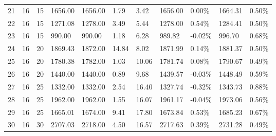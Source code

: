 \documentclass[../main]{subfiles}
\begin{document}
\begin{longtable}{l|ll|lll|lllll}
   21                  & 16                              & 15                     & 1656.00             & 1656.00  & 1.79          & 3.42                       & \cellcolor{green!25}1656.00 & 0.00\%  & 1664.31 & 0.50\% \\
   22                  & 16                              & 15                     & 1271.08             & 1278.00  & 3.49          & 5.44                       & \cellcolor{green!25}1278.00 & 0.54\%  & 1284.41 & 0.50\% \\
   23                  & 16                              & 15                     & 990.00              & 990.00   & 1.18          & 6.28                       & 989.82                      & -0.02\% & 996.70  & 0.68\% \\
   24                  & 16                              & 20                     & 1869.43             & 1872.00  & 14.84         & \cellcolor{green!25}8.02   & \cellcolor{green!25}1871.99 & 0.14\%  & 1881.37 & 0.50\% \\
   25                  & 16                              & 20                     & 1780.38             & 1782.00  & 1.03          & 10.06                      & \cellcolor{green!25}1781.74 & 0.08\%  & 1790.67 & 0.49\% \\
   26                  & 16                              & 20                     & 1440.00             & 1440.00  & 0.89          & 9.68                       & 1439.57                     & -0.03\% & 1448.49 & 0.59\% \\
   27                  & 16                              & 25                     & 1332.00             & 1332.00  & 2.54          & 16.40                      & 1327.74                     & -0.32\% & 1343.73 & 0.88\% \\
   28                  & 16                              & 25                     & 1962.00             & 1962.00  & 1.55          & 16.07                      & 1961.17                     & -0.04\% & 1973.06 & 0.56\% \\
   29                  & 16                              & 25                     & 1665.01             & 1674.00  & 9.41          & 17.80                      & \cellcolor{green!25}1673.84 & 0.53\%  & 1685.23 & 0.67\% \\
   30                  & 16                              & 30                     & 2707.03             & 2718.00  & 4.50          & 16.57                      & \cellcolor{green!25}2717.63 & 0.39\%  & 2731.28 & 0.49\% \\

\end{longtable}
\end{document}
